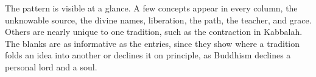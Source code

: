 The pattern is visible at a glance. A few concepts appear in every column, the unknowable source, the divine
names, liberation, the path, the teacher, and grace. Others are nearly unique to one tradition, such as the
contraction in Kabbalah. The blanks are as informative as the entries, since they show where a tradition
folds an idea into another or declines it on principle, as Buddhism declines a personal lord and a soul.
